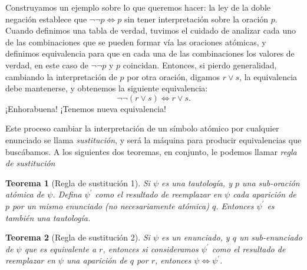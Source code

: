 \documentclass{book}
\newtheorem{thm}{Teorema}[chapter]
\theoremstyle{definition}
\begin{document}
Construyamos un ejemplo sobre lo que queremos hacer: la ley de la doble negación establece que $\neg \neg p \iff p$ sin tener interpretación sobre la oración $p$.
Cuando definimos una tabla de verdad, tuvimos el cuidado de analizar cada uno de las combinaciones que se pueden formar vía las oraciones atómicas, y definimos equivalencia para que en cada una de las combinaciones los valores de verdad, en este caso de $\neg \neg p$ y $p$ coincidan.
Entonces, si pierdo generalidad, cambiando la interpretación de $p$ por otra oración, digamos $r \vee s$, la equivalencia debe mantenerse, y obtenemos la siguiente equivalencia: \[\neg \neg (r \vee s) \iff r \vee s. \]
¡Enhorabuena! ¡Tenemos nueva equivalencia!

Este proceso cambiar la interpretación de un símbolo atómico por cualquier enunciado se llama \emph{sustitución}, y será la máquina para producir equivalencias que buscábamos.
A los siguientes dos teoremas, en conjunto, le podemos llamar \emph{regla de sustitución}
\begin{thm}[Regla de sustitución 1]
	Si $\psi$ es una tautología, y $p$ una sub-oración atómica de $\psi$. Defina $\psi^\prime$ como el resultado de reemplazar en $\psi$ cada aparición de $p$ por un mismo enunciado (no necesariamente atómica) $q$. Entonces $\psi^\prime$ es también una tautología.
\end{thm}
\begin{thm}[Regla de sustitución 2]
	Si $\psi$ es un enunciado, y $q$ un sub-enunciado de $\psi$ que es equivalente a $r$, entonces si consideramos $\psi^\prime$ como el resultado de reemplazar en $\psi$ una aparición de $q$ por $r$, entonces $\psi \iff \psi^\prime$.
\end{thm}
\end{document}
